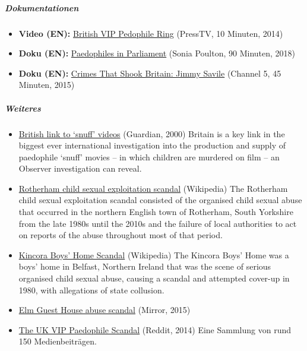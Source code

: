 \hypertarget{dokumentationen-1}{%
\subparagraph{\texorpdfstring{\textbf{Dokumentationen}}{Dokumentationen}}\label{dokumentationen-1}}

\begin{itemize}
\tightlist
\item
  \textbf{Video (EN):}
  \href{https://www.youtube.com/watch?v=hg0PVBYcQMc}{British VIP
  Pedophile Ring} (PressTV, 10 Minuten, 2014)
\item
  \textbf{Doku (EN):}
  \href{https://www.youtube.com/watch?v=PnZiDxkwgrU}{Paedophiles in
  Parliament} (Sonia Poulton, 90 Minuten, 2018)
\item
  \textbf{Doku (EN):}
  \href{https://www.youtube.com/watch?v=8wo7g2k87xY}{Crimes That Shook
  Britain: Jimmy Savile} (Channel 5, 45 Minuten, 2015)
\end{itemize}

\hypertarget{weiteres}{%
\subparagraph{\texorpdfstring{\textbf{Weiteres}}{Weiteres}}\label{weiteres}}

\begin{itemize}
\tightlist
\item
  \href{https://www.theguardian.com/uk/2000/oct/01/ameliagentleman.philipwillan}{British
  link to `snuff' videos} (Guardian, 2000) Britain is a key link in the
  biggest ever international investigation into the production and
  supply of paedophile `snuff' movies -- in which children are murdered
  on film -- an Observer investigation can reveal.
\item
  \href{https://en.wikipedia.org/wiki/Rotherham_child_sexual_exploitation_scandal}{Rotherham
  child sexual exploitation scandal} (Wikipedia) The Rotherham child
  sexual exploitation scandal consisted of the organised child sexual
  abuse that occurred in the northern English town of Rotherham, South
  Yorkshire from the late 1980s until the 2010s and the failure of local
  authorities to act on reports of the abuse throughout most of that
  period.
\item
  \href{https://en.wikipedia.org/wiki/Kincora_Boys'_Home}{Kincora Boys'
  Home Scandal} (Wikipedia) The Kincora Boys' Home was a boys' home in
  Belfast, Northern Ireland that was the scene of serious organised
  child sexual abuse, causing a scandal and attempted cover-up in 1980,
  with allegations of state collusion.
\item
  \href{https://www.mirror.co.uk/all-about/elm-guest-house-abuse-scandal}{Elm
  Guest House abuse scandal} (Mirror, 2015)
\item
  \href{https://www.reddit.com/r/conspiracy/comments/2boqzq/the_breaking_uk_vip_paedophile_scandal_what_we/}{The
  UK VIP Paedophile Scandal} (Reddit, 2014) Eine Sammlung von rund 150
  Medienbeiträgen.
\end{itemize}

